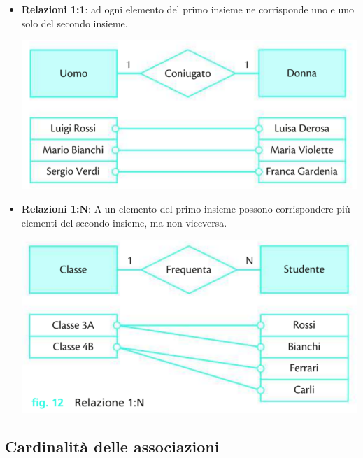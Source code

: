 \documentclass{article}
\begin{document}
\begin{itemize}
    \item \textbf{Relazioni 1:1}:
        ad ogni elemento del primo insieme ne corrisponde uno e uno solo del secondo insieme.
    \begin{center}
    \includegraphics[scale=0.85]{11.PNG}
    \end{center}
    
    \item\textbf{Relazioni 1:N}: A un elemento del primo insieme possono corrispondere più elementi del secondo insieme, ma non viceversa.
    
    \begin{center}
        \includegraphics[scale=0.85]{1n.PNG}
    \end{center}
\end{itemize}

\subsection{Cardinalità delle associazioni}
\end{document}
